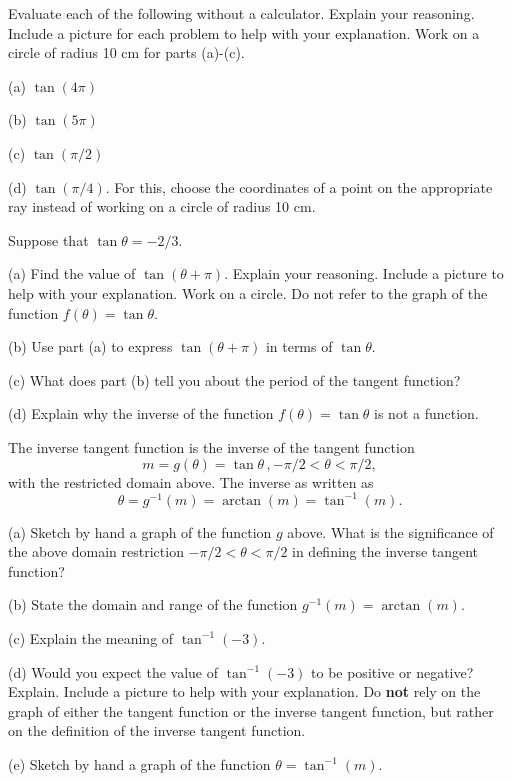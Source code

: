 \documentclass{ximera}
\begin{document}
\begin{question}   \label{Q9:InverseTrig}
Evaluate each of the following without a calculator. Explain your reasoning. Include a picture for each problem to help with your explanation. Work on a circle of radius 10 cm for parts (a)-(c).

(a) $\tan (4\pi)$

(b) $\tan (5\pi)$

(c) $\tan (\pi/2)$

(d) $\tan (\pi/4)$. For this, choose the coordinates of a point on the appropriate ray instead of working on a circle of radius 10 cm.

\end{question}


\begin{question}   \label{Q11:InverseTrig}
Suppose that $\tan\theta = -2/3$.

(a) Find the value of $\tan (\theta + \pi)$. Explain your reasoning. Include a picture to help with your explanation. Work on a circle. Do not refer to the graph of the function $f(\theta) = \tan\theta$.

(b) Use part (a) to express $\tan(\theta + \pi)$ in terms of $\tan\theta$. 

(c) What does part (b) tell you about the period of the tangent function?

(d) Explain why the inverse of the function $f(\theta) = \tan\theta$ is not a function.

\end{question}

The inverse tangent function is the inverse of the tangent function
\[
   m = g(\theta) = \tan \theta \, , -\pi/2 < \theta < \pi/2 ,
\]
with the restricted domain above. The inverse as written as
\[
    \theta = g^{-1}(m) = \arctan (m) = \tan^{-1}(m) .
\]

\begin{question} \label{Q12:InverseTrig}

(a) Sketch by hand a graph of the function $g$ above. What is the significance of the above domain restriction $-\pi/2 < \theta < \pi/2$  in defining the inverse tangent function?

(b) State the domain and range of the function $g^{-1}(m) = \arctan (m)$.

(c) Explain the meaning of $\tan^{-1}(-3)$.

(d) Would you expect the value of $\tan^{-1}(-3)$ to be positive or negative? Explain. Include a picture to help with your explanation. Do {\bf not} rely on the graph of either the tangent function or the inverse tangent function, but rather on the definition of the inverse tangent function. 

(e) Sketch by hand a graph of the function $\theta =  \tan^{-1}(m) $.

\end{question}
\end{document}
